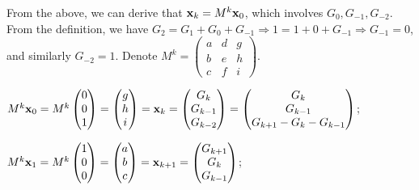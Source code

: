 \documentclass[answers]{exam}
\begin{document}
\begin{questions}
\begin{parts}
\begin{subparts}
\begin{solution}
                From the above, we can derive that $\bm{\mathrm{x}}_k=M^k\bm{\mathrm{x}}_0$, which involves $G_0, G_{-1}, G_{-2}$.
                From the definition, we have $G_2=G_1+G_0+G_{-1} \Rightarrow 1=1+0+G_{-1} \Rightarrow G_{-1}=0$, and similarly $G_{-2}=1$.
                Denote $M^k=\begin{pmatrix}a&d&g\\b&e&h\\c&f&i\end{pmatrix}$.

                $M^k\bm{\mathrm{x}}_0=M^k\begin{pmatrix}0\\0\\1\end{pmatrix}=\begin{pmatrix}g\\h\\i\end{pmatrix}=\bm{\mathrm{x}}_k=\begin{pmatrix}G_k\\G_{k-1}\\G_{k-2}\end{pmatrix}=\begin{pmatrix}G_k\\G_{k-1}\\G_{k+1}-G_k-G_{k-1}\end{pmatrix}$;

                $M^k\bm{\mathrm{x}}_1=M^k\begin{pmatrix}1\\0\\0\end{pmatrix}=\begin{pmatrix}a\\b\\c\end{pmatrix}=\bm{\mathrm{x}}_{k+1}=\begin{pmatrix}G_{k+1}\\G_{k}\\G_{k-1}\end{pmatrix}$;


\end{solution}
\end{subparts}
\end{parts}
\end{questions}
\end{document}
